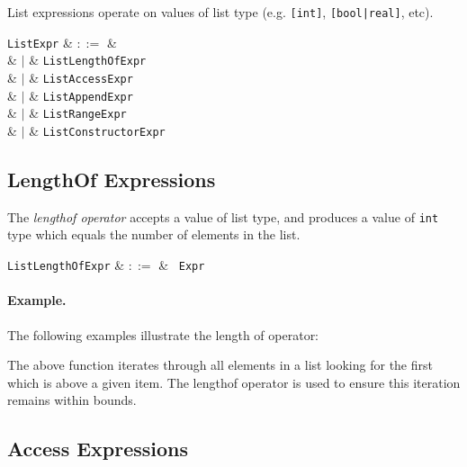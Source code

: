 List expressions operate on values of list type (e.g. \lstinline{[int]}, \lstinline{[bool|real]}, etc).

\begin{syntax}
  \verb+ListExpr+ & $::=$ &\\
  & $|$ & \verb+ListLengthOfExpr+\\
  & $|$ & \verb+ListAccessExpr+\\
  & $|$ & \verb+ListAppendExpr+\\
  & $|$ & \verb+ListRangeExpr+\\
  & $|$ & \verb+ListConstructorExpr+\\
\end{syntax}


\subsection{LengthOf Expressions}
\label{c_expr_lengthof}

The {\em lengthof operator} accepts a value of list type, and produces a value of \lstinline{int} type which equals the number of elements in the list.

\begin{syntax}
\verb+ListLengthOfExpr+ & $::=$ & \token{|}\ \verb+Expr+\ \token{|}\\
\end{syntax}

\paragraph{Example.} The following examples illustrate the length of operator:



The above function iterates through all elements in a list looking for the first which is above a given item.  The lengthof operator is used to ensure this iteration remains within bounds.


\subsection{Access Expressions}
\label{c_expr_list_access}


